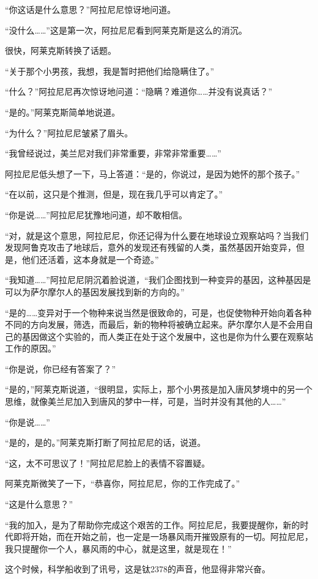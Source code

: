 “你这话是什么意思？”阿拉尼尼惊讶地问道。 

“没什么……”这是第一次，阿拉尼尼看到阿莱克斯是这么的消沉。 

很快，阿莱克斯转换了话题。 

“关于那个小男孩，我想，我是暂时把他们给隐瞒住了。” 

“什么？”阿拉尼尼再次惊讶地问道：“隐瞒？难道你……并没有说真话？” 

“是的。”阿莱克斯简单地说道。 

“为什么？”阿拉尼尼皱紧了眉头。 

“我曾经说过，美兰尼对我们非常重要，非常非常重要……” 

阿拉尼尼低头想了一下，马上答道：“是的，你说过，是因为她怀的那个孩子。” 

“在以前，这只是个推测，但是，现在我几乎可以肯定了。” 

“你是说……”阿拉尼尼犹豫地问道，却不敢相信。 

“对，就是这个意思，阿拉尼尼，你还记得为什么要在地球设立观察站吗？当我们发现阿鲁克攻击了地球后，意外的发现还有残留的人类，虽然基因开始变异，但是，他们还活着，这本身就是一个奇迹。” 

“我知道……”阿拉尼尼阴沉着脸说道，“我们企图找到一种变异的基因，这种基因是可以为萨尔摩尔人的基因发展找到新的方向的。” 

“是的……变异对于一个物种来说当然是很致命的，可是，也促使物种开始向着各种不同的方向发展，筛选，而最后，新的物种将被确立起来。萨尔摩尔人是不会用自己的基因做这个实验的，而人类正在处于这个发展中，这也是你为什么要在观察站工作的原因。” 

“你是说，你已经有答案了？” 

“是的，”阿莱克斯说道，“很明显，实际上，那个小男孩是加入唐风梦境中的另一个思维，就像美兰尼加入到唐风的梦中一样，可是，当时并没有其他的人……” 

“你是说……” 

“是的，是的。”阿莱克斯打断了阿拉尼尼的话，说道。 

“这，太不可思议了！”阿拉尼尼脸上的表情不容置疑。 

阿莱克斯微笑了一下，“恭喜你，阿拉尼尼，你的工作完成了。” 

“这是什么意思？” 

“我的加入，是为了帮助你完成这个艰苦的工作。阿拉尼尼，我要提醒你，新的时代即将开始，而在开始之前，也一定是一场暴风雨开摧毁原有的一切。阿拉尼尼，我只提醒你一个人，暴风雨的中心，就是这里，就是现在！” 

这个时候，科学船收到了讯号，这是钛2378的声音，他显得非常兴奋。 

